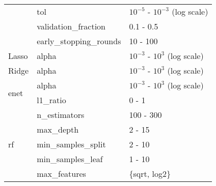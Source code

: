 \begin{table*}
\begin{tabular}{@{}l>{\ttfamily}lp{}@{}}
                               & tol                         & $10^{-5}$ - $10^{-3}$ (log scale)         \\ \cmidrule{2-3}
                               & validation\_fraction        & 0.1 - 0.5                                 \\ \cmidrule{2-3}
                               & early\_stopping\_rounds     & 10 - 100                                  \\ \midrule
Lasso                          & alpha                       & $10^{-3}$ - $10^{3}$ (log scale)          \\ \midrule
Ridge                          & alpha                       & $10^{-3}$ - $10^{3}$ (log scale)          \\ \midrule
\multirow{2}{*}{\gls{enet}}    & alpha                       & $10^{-3}$ - $10^{3}$ (log scale)          \\ \cmidrule{2-3}
                               & l1\_ratio                   & 0 - 1                                     \\ \midrule
\multirow{5}{*}{\gls{rf}}      & n\_estimators               & 100 - 300                                 \\ \cmidrule{2-3}
                               & max\_depth                  & 2 - 15                                    \\ \cmidrule{2-3}
                               & min\_samples\_split         & 2 - 10                                    \\ \cmidrule{2-3}
                               & min\_samples\_leaf          & 1 - 10                                    \\ \cmidrule{2-3}
                               & max\_features               & \{sqrt, log2\}                            \\ \bottomrule
\end{tabular}
\label{tab:optuna_model_configurations}
\end{table*}
